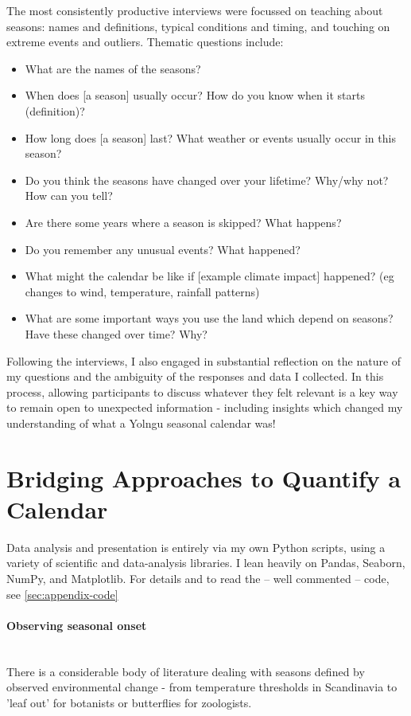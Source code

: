 The most consistently productive interviews were focussed on teaching about
seasons: names and definitions, typical conditions and timing, and touching on
extreme events and outliers. Thematic questions include:
\begin{itemize}
\item What are the names of the seasons?
\item When does [a season] usually occur?  How do you know when it starts (definition)?
\item How long does [a season] last?  What weather or events usually occur in this season?
\item Do you think the seasons have changed over your lifetime?  Why/why not?  How can you tell?
\item Are there some years where a season is skipped?  What happens?
\item Do you remember any unusual events?  What happened?
\item What might the calendar be like if [example climate impact] happened? 
      (eg changes to wind, temperature, rainfall patterns) 
\item What are some important ways you use the land which depend on seasons?  Have these changed over time?  Why?
\end{itemize}

Following the interviews, I also engaged in substantial reflection on the nature
of my questions and the ambiguity of the responses and data I collected.
In this process, allowing participants to discuss whatever they felt relevant
is a key way to remain open to unexpected information - including insights
which changed my understanding of what a Yolngu seasonal calendar was!






\section{Bridging Approaches to Quantify a Calendar}


Data analysis and presentation is entirely via my own Python scripts,
using a variety of scientific and data-analysis libraries.
I lean heavily on Pandas, Seaborn, NumPy, and Matplotlib.
For details and to read the -- well commented -- code, see
\autoref{sec:appendix-code}


\paragraph{Observing seasonal onset}~\\
There is a considerable body of literature dealing with seasons defined
by observed environmental change - from temperature thresholds in
Scandinavia to 'leaf out' for botanists or butterflies for zoologists.


